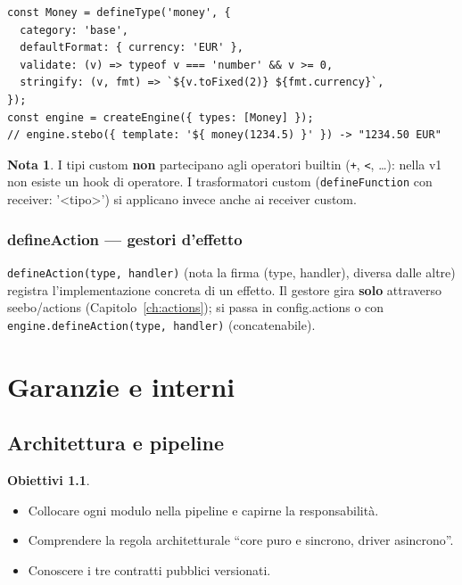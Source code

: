 \documentclass[11pt,a4paper]{book}
\let\code\lstinline
\newcommand{\ic}[1]{{\ttfamily #1}}
\theoremstyle{definition}
\newtheorem*{obiettivi}{Obiettivi}
\newtheorem*{nota}{Nota}
\begin{document}
{{{{\begin{lstlisting}
const Money = defineType('money', {
  category: 'base',
  defaultFormat: { currency: 'EUR' },
  validate: (v) => typeof v === 'number' && v >= 0,
  stringify: (v, fmt) => `${v.toFixed(2)} ${fmt.currency}`,
});
const engine = createEngine({ types: [Money] });
// engine.stebo({ template: '${ money(1234.5) }' }) -> "1234.50 EUR"
\end{lstlisting}

\begin{nota}
I tipi custom \textbf{non} partecipano agli operatori builtin (\code|+|, \code|<|,
\ldots): nella v1 non esiste un hook di operatore. I trasformatori custom
(\code|defineFunction| con \ic{receiver: '<tipo>'}) si applicano invece anche ai
receiver custom.
\end{nota}

\section{defineAction --- gestori d'effetto}

\code|defineAction(type, handler)| (nota la firma \ic{(type, handler)}, diversa
dalle altre) registra l'implementazione concreta di un effetto. Il gestore gira
\textbf{solo} attraverso \ic{seebo/actions} (Capitolo~\ref{ch:actions}); si passa in
\ic{config.actions} o con \code|engine.defineAction(type, handler)| (concatenabile).

\part{Garanzie e interni}

\chapter{Architettura e pipeline}
\label{ch:architettura}

\begin{obiettivi}
\begin{itemize}
  \item Collocare ogni modulo nella pipeline e capirne la responsabilità.
  \item Comprendere la regola architetturale ``core puro e sincrono, driver
    asincrono''.
  \item Conoscere i tre contratti pubblici versionati.
\end{itemize}
\end{obiettivi}

}}}}
\end{document}
